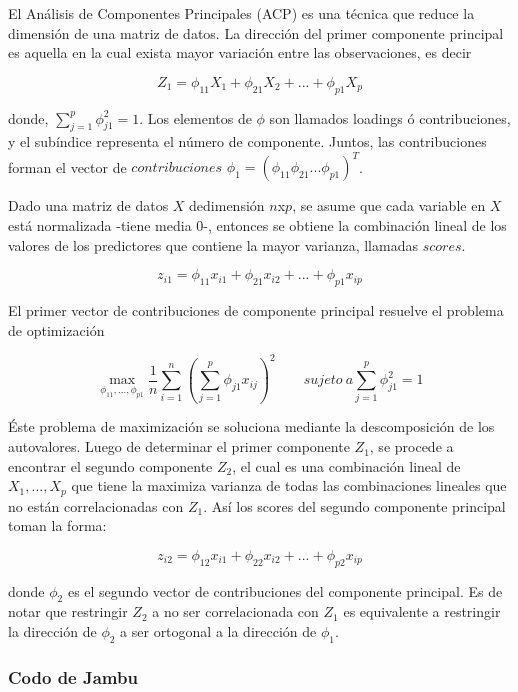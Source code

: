 \documentclass[a4paper,12pt]{Latex/Classes/PhDthesisPSnPDF}
\begin{document}
El Análisis de Componentes Principales (ACP) es una técnica que reduce la dimensión de una matriz de datos. La dirección del primer componente principal es aquella en la cual exista mayor variación entre las observaciones, es decir

$$ Z_{1} = \phi_{11}X_{1} + \phi_{21}X_{2} + ... + \phi_{p1}X_{p} $$

donde, $ \sum_{j=1}^{p} \phi_{j1}^{2} = 1 $. Los elementos de $ \phi $ son llamados loadings ó contribuciones, y el subíndice representa el número de componente. Juntos, las contribuciones forman el vector de $contribuciones$ $\phi_{1} = (\phi_{11} \phi_{21}... \phi_{p1})^T$.

Dado una matriz de datos $X$ dedimensión $n$x$p$, se asume que cada variable en $X$ está normalizada -tiene media 0-, entonces se obtiene la combinación lineal de los valores de los predictores que contiene la mayor varianza, llamadas $scores$.

$$ z_{i1} = \phi_{11} x_{i1} + \phi_{21} x_{i2} + ... + \phi_{p1} x_{ip} $$

El primer vector de contribuciones de componente principal resuelve el problema de optimización

$$ \max_{\phi_{11}, ..., \phi_{p1}}
\frac{1}{n} \sum_{i = 1}^{n} (\sum_{j=1}^{p} \phi_{j1} x_{ij})^2
\qquad sujeto \ a  \sum_{j=1}^{p} \phi_{j1}^{2} = 1
$$

Éste problema de maximización se soluciona mediante la descomposición de los autovalores. Luego de determinar el primer componente $Z_{1}$, se procede a encontrar el segundo componente $Z_{2}$, el cual es una combinación lineal de $ X_{1}, ..., X_{p} $ que tiene la maximiza varianza de todas las combinaciones lineales que no están correlacionadas con $Z_{1}$. Así los scores del segundo componente principal toman la forma:

$$ z_{i2} = \phi_{12}x_{i1} + \phi_{22}x_{i2} + ... + \phi_{p2}x_{ip} $$

donde $\phi_{2}$ es el segundo vector de contribuciones del componente principal. Es de notar que restringir $Z_{2}$ a no ser correlacionada con $Z_{1}$ es equivalente a restringir la dirección de $\phi_{2}$ a ser ortogonal a la dirección de $\phi_{1}$.


\subsubsection{Codo de Jambu}
\end{document}

